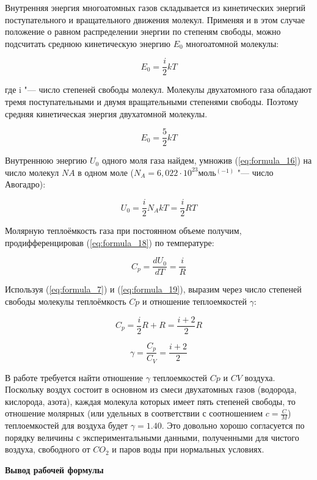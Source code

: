 Внутренняя энергия многоатомных газов складывается из кинетических энергий поступательного и вращательного движения молекул. Применяя и в этом случае положение о равном распределении энергии по степеням свободы, можно подсчитать среднюю кинетическую энергию $E_0$ многоатомной молекулы:

\begin{equation}
    E_0 = \frac{i}{2} k T
    \label{eq:formula_16}
\end{equation}

где i "--- число степеней свободы молекул. Молекулы двухатомного газа обладают тремя поступательными и двумя вращательными степенями свободы. Поэтому средняя кинетическая энергия двухатомной молекулы.

\begin{equation}
    E_0 = \frac{5}{2} k T
    \label{eq:formula_17}
\end{equation}

Внутреннюю энергию $U_0$ одного моля газа найдем, умножив (\ref{eq:formula_16}) на число молекул $NA$ в одном моле ($N_A = 6,022·10^23 моль^(-1)$ "--- число Авогадро):

\begin{equation}
    U_0 = \frac{i}{2} N_A k T = \frac{i}{2} R T
    \label{eq:formula_18}
\end{equation}

Молярную теплоёмкость газа при постоянном объеме получим, продифференцировав (\ref{eq:formula_18}) по температуре:

\begin{equation}
    C_p = \frac{d U_0}{d T} = \frac{i}{R}
    \label{eq:formula_19}
\end{equation}

Используя (\ref{eq:formula_7}) и (\ref{eq:formula_19}), выразим через число степеней свободы молекулы теплоёмкость $Cp$ и отношение теплоемкостей $\gamma$:

\begin{equation*}
    C_p = \frac{i}{2} R + R = \frac{i + 2}{2} R
\end{equation*}

\begin{equation*}
    \gamma = \frac{C_p}{C_V} = \frac{i + 2}{2}
\end{equation*}

В работе требуется найти отношение $\gamma$ теплоемкостей $Cp$ и $CV$ воздуха. Поскольку воздух состоит в основном из смеси двухатомных газов (водорода, кислорода, азота), каждая молекула которых имеет пять степеней свободы, то отношение молярных (или удельных в соответствии с соотношением $c = \frac{C}{M}$) теплоемкостей для воздуха будет $\gamma = 1.40$. Это довольно хорошо согласуется по порядку величины с экспериментальными данными, полученными для чистого воздуха, свободного от $CO_2$ и паров воды при нормальных условиях.

\begin{center}
    \textbf{Вывод рабочей формулы}
\end{center}











